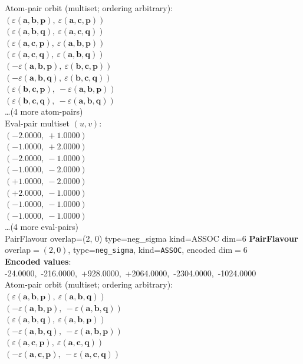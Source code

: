 \documentclass[a4paper,11pt]{article}
\newcommand{\kblbmcpggoncpf}[3]{\varepsilon(\mathbf{#1},\mathbf{#2},\mathbf{#3})}
\begin{document}
\quad Atom-pair orbit (multiset; ordering arbitrary):\\
$(\kblbmcpggoncpf{a}{b}{p},\ \kblbmcpggoncpf{a}{c}{p})$\\
$(\kblbmcpggoncpf{a}{b}{q},\ \kblbmcpggoncpf{a}{c}{q})$\\
$(\kblbmcpggoncpf{a}{c}{p},\ \kblbmcpggoncpf{a}{b}{p})$\\
$(\kblbmcpggoncpf{a}{c}{q},\ \kblbmcpggoncpf{a}{b}{q})$\\
$(-\kblbmcpggoncpf{a}{b}{p},\ \kblbmcpggoncpf{b}{c}{p})$\\
$(-\kblbmcpggoncpf{a}{b}{q},\ \kblbmcpggoncpf{b}{c}{q})$\\
$(\kblbmcpggoncpf{b}{c}{p},\ -\kblbmcpggoncpf{a}{b}{p})$\\
$(\kblbmcpggoncpf{b}{c}{q},\ -\kblbmcpggoncpf{a}{b}{q})$\\
\quad \ldots (4 more atom-pairs)\\
\quad Eval-pair multiset $(u, v)$:\\
$(-2.0000,\ +1.0000)$\\
$(-1.0000,\ +2.0000)$\\
$(-2.0000,\ -1.0000)$\\
$(-1.0000,\ -2.0000)$\\
$(+1.0000,\ -2.0000)$\\
$(+2.0000,\ -1.0000)$\\
$(-1.0000,\ -1.0000)$\\
$(-1.0000,\ -1.0000)$\\
\quad \ldots (4 more eval-pairs)\\
    PairFlavour  overlap=(2, 0)  type=neg\_sigma  kind=ASSOC  dim=6
\textbf{PairFlavour} overlap$=(2, 0)$, type=\texttt{neg\_sigma}, kind=\texttt{ASSOC}, encoded dim$=6$\\
\textbf{      Encoded values}: -24.0000,\ -216.0000,\ +928.0000,\ +2064.0000,\ -2304.0000,\ -1024.0000\\
\quad Atom-pair orbit (multiset; ordering arbitrary):\\
$(\kblbmcpggoncpf{a}{b}{p},\ \kblbmcpggoncpf{a}{b}{q})$\\
$(-\kblbmcpggoncpf{a}{b}{p},\ -\kblbmcpggoncpf{a}{b}{q})$\\
$(\kblbmcpggoncpf{a}{b}{q},\ \kblbmcpggoncpf{a}{b}{p})$\\
$(-\kblbmcpggoncpf{a}{b}{q},\ -\kblbmcpggoncpf{a}{b}{p})$\\
$(\kblbmcpggoncpf{a}{c}{p},\ \kblbmcpggoncpf{a}{c}{q})$\\
$(-\kblbmcpggoncpf{a}{c}{p},\ -\kblbmcpggoncpf{a}{c}{q})$\\
\end{document}
